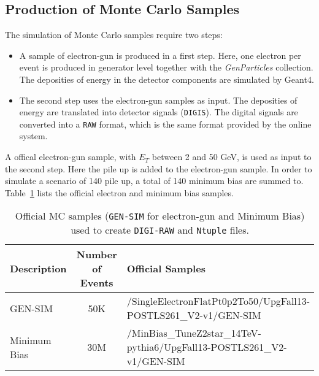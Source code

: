 \documentclass[a4paper,12pt,oneside]{article}
\begin{document}
            \subsection{Production of Monte Carlo Samples}

                   The simulation of Monte Carlo samples require two steps:
                   \begin{itemize}
                     \item A sample of electron-gun is produced in a first step. Here, one electron per event is produced in generator
                       level together with the {\it GenParticles} collection. The deposities of energy in the detector components
                       are simulated by Geant4.
                     \item The second step uses the electron-gun samples as input. The deposities of energy are
                       translated into detector signals (\texttt{DIGIS}). The digital signals are converted into a {\texttt{RAW}} format, which is the
                       same format provided by the online system.
                   \end{itemize}

                   A offical electron-gun sample, with $E_{T}$ between 2 and 50 GeV, is used as input to the second step. Here the
                   pile up is added to the electron-gun sample. In order to simulate a scenario of 140 pile up, a total of 140
                   minimum bias are summed to. Table~\ref{tab:gen-sim-minbias} lists the official electron and minimum bias samples.

                   \begin{table}[!htb]
                   \centering
                   \scriptsize
                     \caption{Official MC samples (\texttt{GEN-SIM} for electron-gun and Minimum Bias) used to create
                       \texttt{DIGI-RAW} and \texttt{Ntuple} files.}
                     \label{tab:gen-sim-minbias}
                     \begin{tabular}{lcl}
\hline
{\bf Description} & {\bf Number of Events} & {\bf Official Samples} \\ \hline \hline
GEN-SIM           & 50K                    & /SingleElectronFlatPt0p2To50/UpgFall13-POSTLS261\_V2-v1/GEN-SIM \\ \hline
Minimum Bias      & 30M                    & /MinBias\_TuneZ2star\_14TeV-pythia6/UpgFall13-POSTLS261\_V2-v1/GEN-SIM \\ \hline
                     \end{tabular}
                   \end{table}
\end{document}
